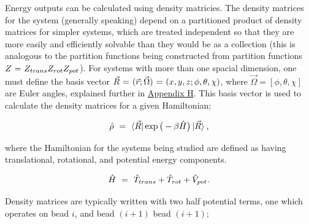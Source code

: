 \documentclass[11pt]{article}
\begin{document}
Energy outputs can be calculated using density matricies. The density matrices for the system (generally speaking) depend on a partitioned product of density matrices for simpler systems, which are treated independent so that they are more easily and efficiently solvable than they would be as a collection (this is  analogous to the partition functions being constructed from partition functions \begin{math} Z \hspace{0.025cm} = \hspace{0.025cm} Z_{trans} Z_{rot} Z_{pot} \end{math}). For systems with more than one spacial dimension, one must define the basis vector \begin{math} \vec{R} \hspace{0.025cm} = \hspace{0.025cm} (\vec{r};\vec{\Omega})  \hspace{0.025cm} = \hspace{0.025cm} (x,y,z;\phi,\theta,\chi) \end{math}, where \begin{math} \vec{\Omega} = [\phi,\theta,\chi] \end{math} are Euler angles, explained further in \hyperlink{wr-appendix-h}{Appendix H}. This basis vector is used to calculate the density matrices for a given Hamiltonian;

\begin{equation} \label{wr-eq-36-1}
\hat{\rho} \hspace{0.125cm} = \hspace{0.125cm} \bra{\vec{R}} \exp \big( - \beta \hat{H} \big) \ket{\vec{R}} \hspace{0.025cm} , 
\end{equation}

where the Hamiltonian for the systems being studied are defined as having translational, rotational, and potential energy components.

\begin{equation} \label{wr-eq-37-1}
\hat{H} \hspace{0.125cm} = \hspace{0.125cm} \hat{T}_{trans} + \hat{T}_{rot} + \hat{V}_{pot} \hspace{0.025cm} .
\end{equation}

Density matrices are typically written with two half potential terms, one which operates on bead \begin{math} i \end{math}, and bead \begin{math} (i+1) \end{math} bead \begin{math} (i+1) \end{math};
\end{document}

